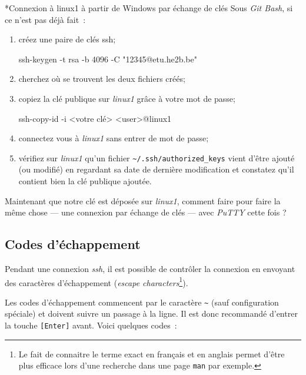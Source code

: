 \documentclass[a4paper,11pt]{article}
\begin{document}
\clearpage
\begin{Exercice}*{Connexion à linux1 à partir de Windows par échange de clés}
	Sous \textit{Git Bash}, si ce n'est pas déjà fait~: 

	\begin{enumerate}
		\item créez une paire de clés ssh;
			\begin{term}
				ssh-keygen -t rsa -b 4096 -C "12345@etu.he2b.be"
			\end{term}

		\item cherchez où se trouvent les deux fichiers créés;
		\item copiez la clé publique sur \textit{linux1} grâce à votre mot de passe;
			\begin{term}
				ssh-copy-id -i <votre clé> <user>@linux1
			\end{term}

		\item connectez vous à \textit{linux1} sans entrer de mot de passe;
		
		\item vérifiez sur \textit{linux1} qu'un fichier
			\texttt{\textasciitilde/.ssh/authorized\_keys} vient d'être ajouté (ou modifié) en
			regardant sa date de dernière modification et constatez qu'il contient
			bien la clé publique ajoutée.	
	\end{enumerate}

	Maintenant que notre clé est déposée sur \textit{linux1}, comment faire pour
	faire la même chose — une connexion par échange de clés — avec
	\textit{PuTTY} cette fois ?

\end{Exercice}



\subsection{Codes d'échappement}


Pendant une connexion \textit{ssh}, il est possible de contrôler la connexion en
envoyant des caractères d'échappement (\textit{escape characters}\footnote{Le
	fait de connaitre le terme exact en français et en anglais permet d'être
	plus efficace lors d'une recherche dans une page \texttt{man} par exemple.
}). 

Les codes d'échappement commencent par le caractère \texttt{\textasciitilde}
(sauf configuration spéciale) et doivent suivre un passage à la ligne. Il est donc
recommandé d'entrer la touche \texttt{[Enter]} avant. Voici quelques codes~:
\end{document}
